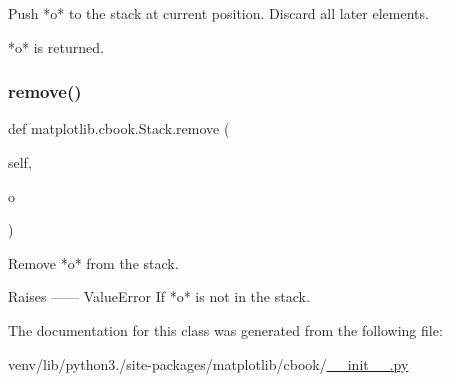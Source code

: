 \begin{DoxyVerb}Push *o* to the stack at current position.  Discard all later elements.

*o* is returned.
\end{DoxyVerb}
 \mbox{\label{classmatplotlib_1_1cbook_1_1Stack_ae96ba3695cd6722c4e3a0ef4966b3aa3}} 
\subsubsection{\texorpdfstring{remove()}{remove()}}
{\footnotesize\ttfamily def matplotlib.\+cbook.\+Stack.\+remove (\begin{DoxyParamCaption}\item[{}]{self,  }\item[{}]{o }\end{DoxyParamCaption})}

\begin{DoxyVerb}Remove *o* from the stack.

Raises
------
ValueError
    If *o* is not in the stack.
\end{DoxyVerb}
 

The documentation for this class was generated from the following file\+:\begin{DoxyCompactItemize}
\item 
venv/lib/python3./site-\/packages/matplotlib/cbook/\hyperlink{venv_2lib_2python3_89_2site-packages_2matplotlib_2cbook_2____init_____8py}{\+\_\+\+\_\+init\+\_\+\+\_\+.\+py}\end{DoxyCompactItemize}
